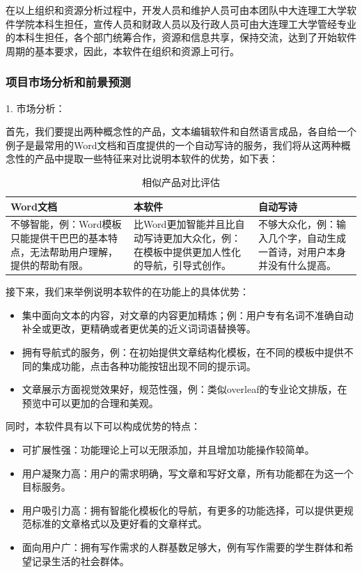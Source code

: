 \documentclass[10pt,letterpaper]{article}
\begin{document}
在以上组织和资源分析过程中，开发人员和维护人员可由本团队中大连理工大学软件学院本科生担任，宣传人员和财政人员以及行政人员可由大连理工大学管经专业的本科生担任，各个部门统筹合作，资源和信息共享，保持交流，达到了开始软件周期的基本要求，因此，本软件在组织和资源上可行。

\subsubsection{项目市场分析和前景预测}
1. 市场分析：

首先，我们要提出两种概念性的产品，文本编辑软件和自然语言成品，各自给一个例子是最常用的Word文档和百度提供的一个自动写诗的服务，我们将从这两种概念性的产品中提取一些特征来对比说明本软件的优势，如下表：

\begin{table}[!htbp]
\centering
\begin{tabular}{|p{3cm}|p{3cm}|p{3cm}|}
\hline
Word文档 & 本软件 & 自动写诗 \\
\hline
不够智能，例：Word模板只能提供干巴巴的基本特点，无法帮助用户理解，提供的帮助有限。 & 比Word更加智能并且比自动写诗更加大众化，例：在模板中提供更加人性化的导航，引导式创作。& 不够大众化，例：输入几个字，自动生成一首诗，对用户本身并没有什么提高。 \\
\hline
\end{tabular}
\caption{相似产品对比评估}\label{tab:aStrangeTable}
\end{table}

接下来，我们来举例说明本软件的在功能上的具体优势：

\begin{itemize}
\item 	集中面向文本的内容，对文章的内容更加精炼；例：用户专有名词不准确自动补全或更改，更精确或者更优美的近义词词语替换等。
\item 	拥有导航式的服务，例：在初始提供文章结构化模板，在不同的模板中提供不同的集成功能，点击各种功能按钮出现不同的提示词。
\item 	文章展示方面视觉效果好，规范性强，例：类似overleaf的专业论文排版，在预览中可以更加的合理和美观。
\end{itemize}

同时，本软件具有以下可以构成优势的特点：

\begin{itemize}
\item 	可扩展性强：功能理论上可以无限添加，并且增加功能操作较简单。
\item 	用户凝聚力高：用户的需求明确，写文章和写好文章，所有功能都在为这一个目标服务。
\item 	用户吸引力高：拥有智能化模板化的导航，有更多的功能选择，可以提供更规范标准的文章格式以及更好看的文章样式。
\item 	面向用户广：拥有写作需求的人群基数足够大，例有写作需要的学生群体和希望记录生活的社会群体。
\end{itemize}
\end{document}
